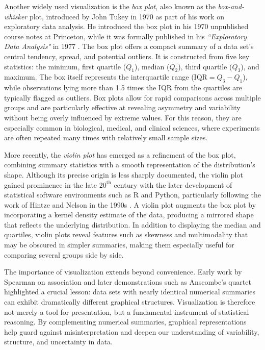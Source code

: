 \medskip

Another widely used visualization is the \textit{box plot}, also known as the \textit{box-and-whisker} plot, introduced by John Tukey in 1970 as part of his work on exploratory data analysis. He introduced the box plot in his 1970 unpublished course notes at Princeton, while it was formally published in his \textit{``Exploratory Data Analysis"} in 1977 \cite{tukey_1977_eda}. The box plot offers a compact summary of a data set’s central tendency, spread, and potential outliers. It is constructed from five key statistics: the minimum, first quartile ($Q_1$), median ($Q_2$), third quartile ($Q_3$), and maximum. The box itself represents the interquartile range ($\mathrm{IQR} = Q_3 - Q_1$), while observations lying more than 1.5 times the IQR from the quartiles are typically flagged as outliers. Box plots allow for rapid comparisons across multiple groups and are particularly effective at revealing asymmetry and variability without being overly influenced by extreme values. For this reason, they are especially common in biological, medical, and clinical sciences, where experiments are often repeated many times with relatively small sample sizes.

\medskip

More recently, the \textit{violin plot} has emerged as a refinement of the box plot, combining summary statistics with a smooth representation of the distribution’s shape. Although its precise origin is less sharply documented, the violin plot gained prominence in the late $20^{\text{th}}$ century with the later development of statistical software environments such as \textsf{R} and \textsf{Python}, particularly following the work of Hintze and Nelson in the 1990s \cite{hintze_1997_violin}. A violin plot augments the box plot by incorporating a kernel density estimate of the data, producing a mirrored shape that reflects the underlying distribution. In addition to displaying the median and quartiles, violin plots reveal features such as skewness and multimodality that may be obscured in simpler summaries, making them especially useful for comparing several groups side by side.

\medskip

The importance of visualization extends beyond convenience. Early work by Spearman on association \cite{spearman_1904_association} and later demonstrations such as Anscombe’s quartet \cite{anscombe_1973_graphs} highlighted a crucial lesson: data sets with nearly identical numerical summaries can exhibit dramatically different graphical structures. Visualization is therefore not merely a tool for presentation, but a fundamental instrument of statistical reasoning. By complementing numerical summaries, graphical representations help guard against misinterpretation and deepen our understanding of variability, structure, and uncertainty in data.

